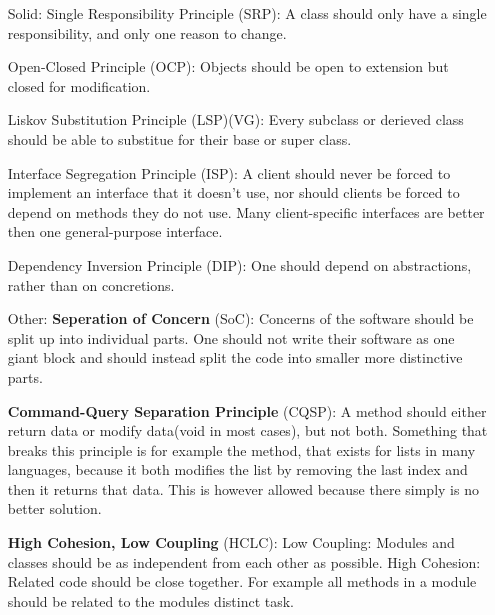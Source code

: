 \documentclass{article}
\begin{document}
\begin{enumerate}
    \item[\huge{Solid:}]
        {\huge S}ingle Responsibility Principle (SRP):\newline
        A class should only have a single responsibility, and only one reason to change.

            {\huge O}pen-Closed Principle (OCP):\newline
        Objects should be open to extension but closed for modification.

            {\huge L}iskov Substitution Principle (LSP)(VG):\newline
        Every subclass or derieved class should be able to substitue
        for their base or super class.

            {\huge I}nterface Segregation Principle (ISP):\newline
        A client should never be forced to implement an interface that it doesn't use, nor
        should clients be forced to depend on methods they do not use. Many
        client-specific interfaces are better then one general-purpose interface.

            {\huge D}ependency Inversion Principle (DIP):\newline
        One should depend on abstractions, rather than on concretions.

    \item[\huge Other:]
        \textbf{Seperation of Concern} (SoC):\newline
        Concerns of the software should be split up into individual parts.
        One should not write their software as one giant block and should instead
        split the code into smaller more distinctive parts.

        \textbf{Command-Query Separation Principle} (CQSP):\newline
        A method should either return data or modify data(void in most cases),
        but not both.\newline
        Something that breaks this principle is for example the  method, that
        exists for lists in many languages, because it both modifies the list by removing
        the last index and then it returns that data. This is however allowed because there
        simply is no better solution.

        \textbf{High Cohesion, Low Coupling} (HCLC):\newline
        Low Coupling: Modules and classes should be as independent from each other as possible.
        \newline
        High Cohesion: Related code should be close together. For example all methods
        in a module should be related to the modules distinct task.


\end{enumerate}
\end{document}
